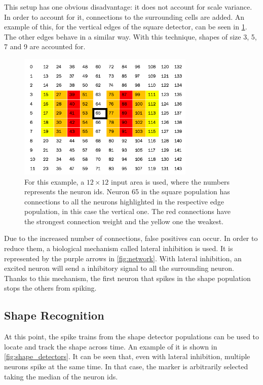 This setup has one obvious disadvantage: it does not account for scale variance. In order to account for it, connections to the surrounding cells are added. An example of this, for the vertical edges of the square detector, can be seen in \cref{fig:shapes_connections}. The other edges behave in a similar way. With this technique, shapes of size 3, 5, 7 and 9 are accounted for. 

\begin{figure}[ht]
\centering
\includegraphics[width=0.75\textwidth]{images/development/shapes_connections.png}
\caption[Vertical Edges of the Square Detector]{For this example, a $12 \times 12$ input area is used, where the numbers represents the neuron ids. Neuron 65 in the square population has connections to all the neurons highlighted in the respective edge population, in this case the vertical one. The red connections have the strongest connection weight and the yellow one the weakest.}
\label{fig:shapes_connections}
\end{figure}

Due to the increased number of connections, false positives can occur. In order to reduce them, a biological mechanism called lateral inhibition is used. It is represented by the purple arrows in \cref{fig:network}. With lateral inhibition, an excited neuron will send a inhibitory signal to all the surrounding neuron. Thanks to this mechanism, the first neuron that spikes in the shape population stops the others from spiking.

\subsection{Shape Recognition}
At this point, the spike trains from the shape detector populations can be used to locate and track the shape across time. An example of it is shown in \cref{fig:shape_detectors}. It can be seen that, even with lateral inhibition, multiple neurons spike at the same time. In that case, the marker is arbitrarily selected taking the median of the neuron ids. 

